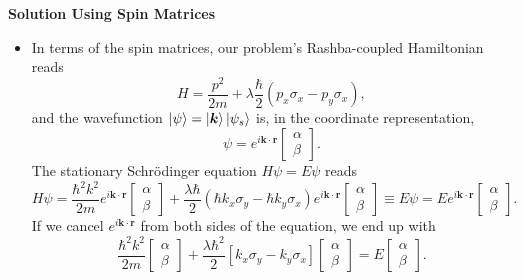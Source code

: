 \documentclass[11pt, a4paper]{article}
\newcommand{\Schro}{Schr\"{o}dinger\xspace}
\renewcommand{\vec}[1]{\bm{#1}} %
\renewcommand{\k}{\vec{k}}  %
\begin{document}
\textbf{Solution Using Spin Matrices}
\begin{itemize}
	\item In terms of the spin matrices, our problem's Rashba-coupled Hamiltonian reads
	\begin{equation*}
		H = \frac{p^{2}}{2m} + \lambda \frac{\hbar}{2}(p_{x}\sigma_{x} - p_{y}\sigma_{x}),
	\end{equation*} 
	and the wavefunction $  \ket{\psi} = \ket{\vec{k}}\ket{\psi_{s}} $ is, in the coordinate representation,
	\begin{equation*}
		\psi = e^{i\vec{k}\cdot \vec{r}} 
		\begin{bmatrix}
		\alpha\\
		\beta
		\end{bmatrix}.
	\end{equation*}
	The stationary \Schro equation $ H \psi = E \psi $ reads
	\begin{equation*}
		H \psi = \frac{\hbar^{2}k^{2}}{2m} e^{i\k \cdot \vec{r}}
		\begin{bmatrix}
			\alpha\\
			\beta
		\end{bmatrix}
		+ \frac{\lambda \hbar}{2}\left(\hbar k_{x}\sigma_{y} - \hbar k_{y}\sigma_{x}\right)
		e^{i\k \cdot \vec{r}}
		\begin{bmatrix}
			\alpha\\
			\beta
		\end{bmatrix}
		\equiv E \psi = E e^{i\k \cdot \vec{r}}
		\begin{bmatrix}
			\alpha\\
			\beta
		\end{bmatrix}.
	\end{equation*}
	If we cancel $ e^{i\k \cdot \vec{r}} $ from both sides of the equation, we end up with
	\begin{equation*}
		\frac{\hbar^{2}k^{2}}{2m}
		\begin{bmatrix}
			\alpha\\
			\beta
		\end{bmatrix} + 
		\frac{\lambda\hbar^{2}}{2}	
		\left[k_{x}\sigma_{y} - k_{y}\sigma_{x}\right]
		\begin{bmatrix}
			\alpha\\
			\beta
		\end{bmatrix}
		 = E
		\begin{bmatrix}
			\alpha\\
			\beta
		\end{bmatrix}.
	\end{equation*}
	

\end{itemize}
\end{document}
